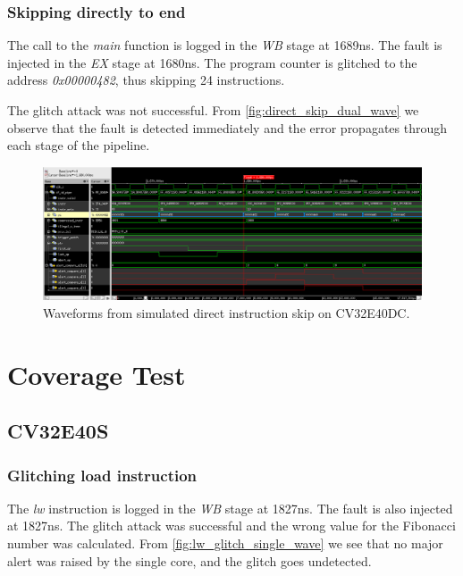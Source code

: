 \subsubsection{Skipping directly to end}

The call to the \textit{main} function is logged in the \textit{WB} stage at 1689ns. The fault is injected in the \textit{EX} stage at 1680ns. The program counter is glitched to the address \textit{0x00000482}, thus skipping 24 instructions.

The glitch attack was not successful. From \autoref{fig:direct_skip_dual_wave} we observe that the fault is detected immediately and the error propagates through each stage of the pipeline. 

\begin{figure}[h!]
    \centering
    \includegraphics[width=\textwidth]{docs/images/direct_skip_dual_core.png}
    \caption{Waveforms from simulated direct instruction skip on CV32E40DC.}
    \label{fig:direct_skip_dual_wave}
\end{figure}


\section{Coverage Test}
\label{sec:cov_test_result}

\subsection{CV32E40S}

\subsubsection{Glitching load instruction}

The \textit{lw} instruction is logged in the \textit{WB} stage at 1827ns. The fault is also injected at 1827ns. The glitch attack was successful and the wrong value for the Fibonacci number was calculated. From \autoref{fig:lw_glitch_single_wave} we see that no major alert was raised by the single core, and the glitch goes undetected. 

